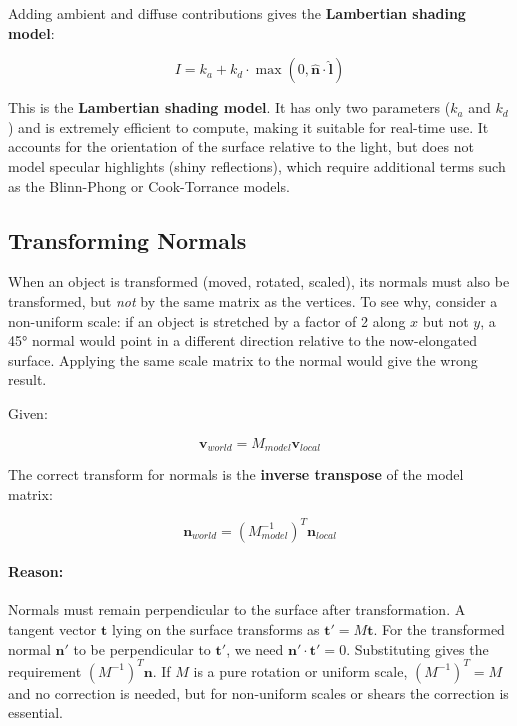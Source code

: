 \documentclass[11pt]{article}
\begin{document}
Adding ambient and diffuse contributions gives the \textbf{Lambertian shading model}:

\begin{equation}
    I = k_a + k_d \cdot \max(0, \hat{\mathbf{n}} \cdot \hat{\mathbf{l}})
\end{equation}

This is the \textbf{Lambertian shading model}. It has only two parameters ($k_a$ and $k_d$) and is extremely efficient to compute, making it suitable for real-time use. It accounts for the orientation of the surface relative to the light, but does not model specular highlights (shiny reflections), which require additional terms such as the Blinn-Phong or Cook-Torrance models.


\subsection{Transforming Normals}

When an object is transformed (moved, rotated, scaled), its normals must also be transformed, but \emph{not} by the same matrix as the vertices. To see why, consider a non-uniform scale: if an object is stretched by a factor of 2 along $x$ but not $y$, a 45° normal would point in a different direction relative to the now-elongated surface. Applying the same scale matrix to the normal would give the wrong result.

Given:

\begin{equation}
    \mathbf{v}_{world} = M_{model} \mathbf{v}_{local}
\end{equation}

The correct transform for normals is the \textbf{inverse transpose} of the model matrix:

\begin{equation}
    \mathbf{n}_{world} = (M_{model}^{-1})^T \mathbf{n}_{local}
\end{equation}

\paragraph{Reason:}

Normals must remain perpendicular to the surface after transformation. A tangent vector $\mathbf{t}$ lying on the surface transforms as $\mathbf{t}' = M\mathbf{t}$. For the transformed normal $\mathbf{n}'$ to be perpendicular to $\mathbf{t}'$, we need $\mathbf{n}' \cdot \mathbf{t}' = 0$. Substituting gives the requirement $(M^{-1})^T \mathbf{n}$. If $M$ is a pure rotation or uniform scale, $(M^{-1})^T = M$ and no correction is needed, but for non-uniform scales or shears the correction is essential.
\end{document}
